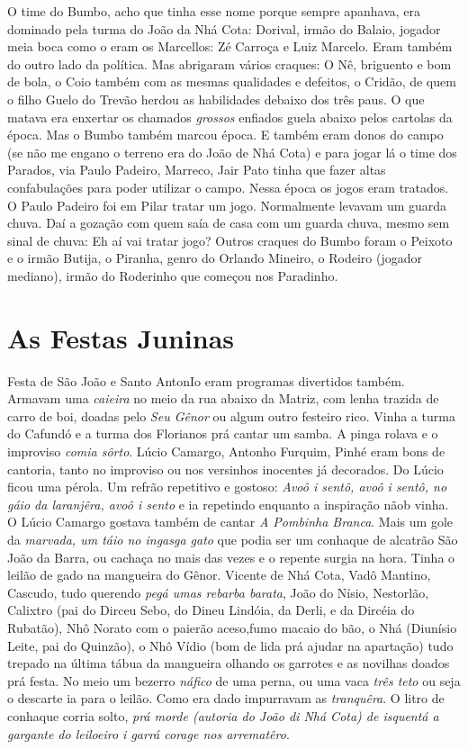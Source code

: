 \documentclass[12pt,brazil,]{book}
\begin{document}
O time do Bumbo, acho que tinha esse nome porque sempre apanhava, era
dominado pela turma do João da Nhá Cota: Dorival, irmão do Balaio,
jogador meia boca como o eram os Marcellos: Zé Carroça e Luiz Marcelo.
Eram também do outro lado da política. Mas abrigaram vários craques: O
Nê, briguento e bom de bola, o Coio também com as mesmas qualidades e
defeitos, o Cridão, de quem o filho Guelo do Trevão herdou as
habilidades debaixo dos três paus. O que matava era enxertar os chamados
\emph{grossos} enfiados guela abaixo pelos cartolas da época. Mas o
Bumbo também marcou época. E também eram donos do campo (se não me
engano o terreno era do João de Nhá Cota) e para jogar lá o time dos
Parados, via Paulo Padeiro, Marreco, Jair Pato tinha que fazer altas
confabulações para poder utilizar o campo. Nessa época os jogos eram
tratados. O Paulo Padeiro foi em Pilar tratar um jogo. Normalmente
levavam um guarda chuva. Daí a gozação com quem saía de casa com um
guarda chuva, mesmo sem sinal de chuva: Eh aí vai tratar jogo? Outros
craques do Bumbo foram o Peixoto e o irmão Butija, o Piranha, genro do
Orlando Mineiro, o Rodeiro (jogador mediano), irmão do Roderinho que
começou nos Paradinho.

\section{As Festas Juninas}\label{as-festas-juninas}

Festa de São João e Santo AntonIo eram programas divertidos também.
Armavam uma \emph{caieira} no meio da rua abaixo da Matriz, com lenha
trazida de carro de boi, doadas pelo \emph{Seu Gênor} ou algum outro
festeiro rico. Vinha a turma do Cafundó e a turma dos Florianos prá
cantar um samba. A pinga rolava e o improviso \emph{comia sôrto}. Lúcio
Camargo, Antonho Furquim, Pinhé eram bons de cantoria, tanto no
improviso ou nos versinhos inocentes já decorados. Do Lúcio ficou uma
pérola. Um refrão repetitivo e gostoso: \emph{Avoô i sentô, avoô i
sentô, no gáio da laranjêra, avoô i sento} e ia repetindo enquanto a
inspiração nãob vinha. O Lúcio Camargo gostava também de cantar \emph{A
Pombinha Branca}. Mais um gole da \emph{marvada, um táio no ingasga
gato} que podia ser um conhaque de alcatrão São João da Barra, ou
cachaça no mais das vezes e o repente surgia na hora. Tinha o leilão de
gado na mangueira do Gênor. Vicente de Nhá Cota, Vadô Mantino, Cascudo,
tudo querendo \emph{pegá umas rebarba barata}, João do Nísio, Nestorlão,
Calixtro (pai do Dirceu Sebo, do Dineu Lindóia, da Derli, e da Dircéia
do Rubatão), Nhô Norato com o paierão aceso,fumo macaio do bão, o Nhá
(Diunísio Leite, pai do Quinzão), o Nhô Vídio (bom de lida prá ajudar na
apartação) tudo trepado na última tábua da mangueira olhando os garrotes
e as novilhas doados prá festa. No meio um bezerro \emph{náfico} de uma
perna, ou uma vaca \emph{três teto} ou seja o descarte ia para o leilão.
Como era dado impurravam as \emph{tranquêra}. O litro de conhaque corria
solto, \emph{prá morde (autoria do João di Nhá Cota) de isquentá a
gargante do leiloeiro i garrá corage nos arrematêro}.
\end{document}
